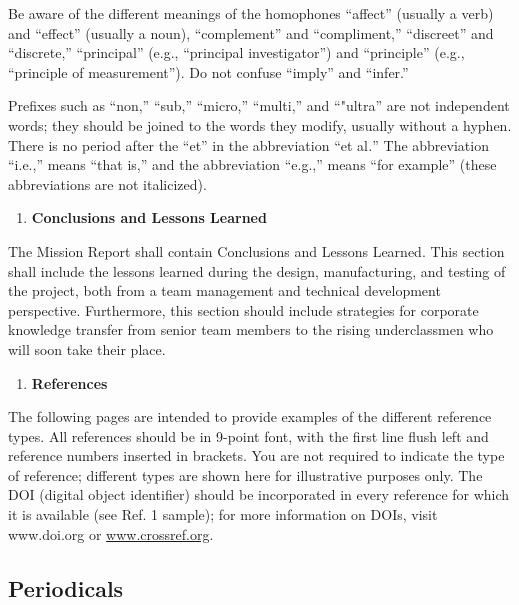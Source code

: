 \documentclass[
]{article}
\begin{document}
Be aware of the different meanings of the homophones ``affect'' (usually
a verb) and ``effect'' (usually a noun), ``complement'' and
``compliment,'' ``discreet'' and ``discrete,'' ``principal'' (e.g.,
``principal investigator'') and ``principle'' (e.g., ``principle of
measurement''). Do not confuse ``imply'' and ``infer.''

Prefixes such as ``non,'' ``sub,'' ``micro,'' ``multi,'' and ``"ultra''
are not independent words; they should be joined to the words they
modify, usually without a hyphen. There is no period after the ``et'' in
the abbreviation ``et al\emph{.}'' The abbreviation ``i.e.,'' means
``that is,'' and the abbreviation ``e.g.,'' means ``for example'' (these
abbreviations are not italicized).

\begin{enumerate}
\def\labelenumi{\arabic{enumi}.}
\setcounter{enumi}{4}
\item
  \textbf{Conclusions and Lessons Learned}
\end{enumerate}

The Mission Report shall contain Conclusions and Lessons Learned. This
section shall include the lessons learned during the design,
manufacturing, and testing of the project, both from a team management
and technical development perspective. Furthermore, this section should
include strategies for corporate knowledge transfer from senior team
members to the rising underclassmen who will soon take their place.

\begin{enumerate}
\def\labelenumi{\arabic{enumi}.}
\setcounter{enumi}{5}
\item
  \textbf{References}
\end{enumerate}

The following pages are intended to provide examples of the different
reference types. All references should be in 9-point font, with the
first line flush left and reference numbers inserted in brackets. You
are not required to indicate the type of reference; different types are
shown here for illustrative purposes only. The DOI (digital object
identifier) should be incorporated in every reference for which it is
available (see Ref. 1 sample); for more information on DOIs, visit
www.doi.org or \href{http://www.crossref.org}{www.crossref.org}.

\subsection{Periodicals}\label{periodicals}
\end{document}
